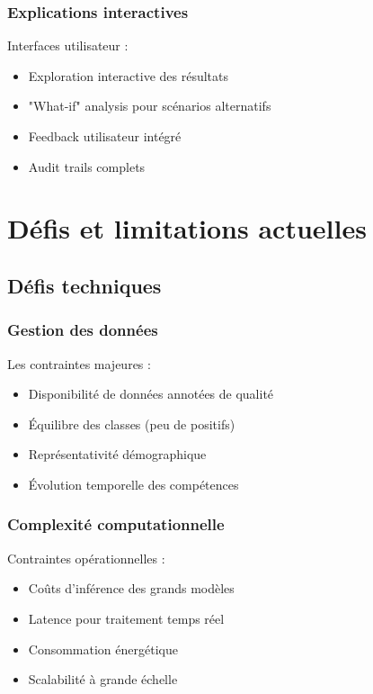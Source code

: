 \documentclass[12pt,a4paper]{report}
\begin{document}
\subsubsection{Explications interactives}

Interfaces utilisateur :
\begin{itemize}
\item Exploration interactive des résultats
\item "What-if" analysis pour scénarios alternatifs
\item Feedback utilisateur intégré
\item Audit trails complets
\end{itemize}

\section{Défis et limitations actuelles}

\subsection{Défis techniques}

\subsubsection{Gestion des données}

Les contraintes majeures :
\begin{itemize}
\item Disponibilité de données annotées de qualité
\item Équilibre des classes (peu de positifs)
\item Représentativité démographique
\item Évolution temporelle des compétences
\end{itemize}

\subsubsection{Complexité computationnelle}

Contraintes opérationnelles :
\begin{itemize}
\item Coûts d'inférence des grands modèles
\item Latence pour traitement temps réel
\item Consommation énergétique
\item Scalabilité à grande échelle
\end{itemize}
\end{document}

